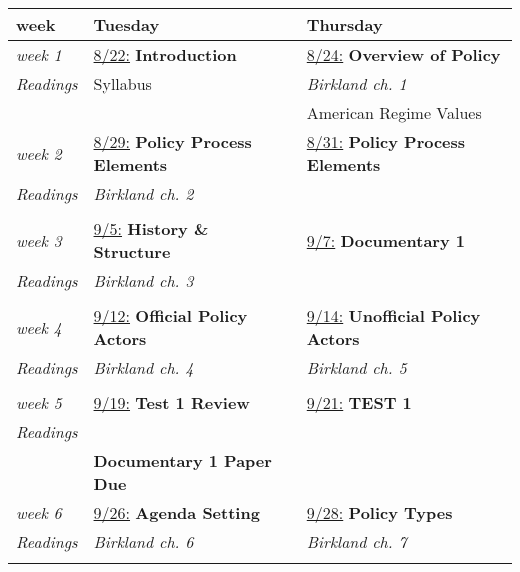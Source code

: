 \documentclass[12pt, letterpaper]{article}
\begin{document}
    \begin{center}
\begin{longtable}{p{2cm} | p{6.8cm} | p{6.8cm}}	
	\label{tab:schedule} \\
	\large{\textbf{week}} & \large{\textbf{Tuesday}} 						& \large{\textbf{Thursday}} 						\\ \hline \hline
	
	\emph{week 1} 	& \underline{8/22:} \textbf{Introduction}				& \underline{8/24:} \textbf{Overview of Policy} 	\\
	\emph{Readings}	& Syllabus 												& \textit{Birkland ch. 1}							\\
					& 														&	American Regime Values							\\ \hline
	
	\emph{week 2} 	& \underline{8/29:} \textbf{Policy Process Elements}	&  \underline{8/31:} \textbf{Policy Process Elements} 	\\
	\emph{Readings} & \textit{Birkland ch. 2}								&  													\\
					& 														& 													\\ \hline
	
	\emph{week 3}	& 	\underline{9/5:} \textbf{History \& Structure}		& \underline{9/7:} \textbf{Documentary 1}			\\
	\emph{Readings}	& 	\textit{Birkland ch. 3}								& 													\\
					& 														& 													\\ \hline
	
	\emph{week 4}	& \underline{9/12:} \textbf{Official Policy Actors}		& \underline{9/14:} \textbf{Unofficial Policy Actors}		\\
	\emph{Readings}	& \textit{Birkland ch. 4 }								& \textit{Birkland ch. 5}							\\
					&														& 													\\ \hline
				
	\emph{week 5}	& \underline{9/19:} \textbf{Test 1 Review}		 		& \underline{9/21:} \textbf{TEST 1} 				\\
	\emph{Readings}	& 														& 													\\
					& \textbf{Documentary 1 Paper Due}						& 													\\ \hline	

	
	\emph{week 6}  	& \underline{9/26:} \textbf{Agenda Setting}				& \underline{9/28:} \textbf{Policy Types}			\\
	\emph{Readings}	& \textit{Birkland ch. 6}								& \textit{Birkland ch. 7} 							\\
					& 														& 													\\ \hline	
	

\end{longtable}
\end{center}
\end{document}
